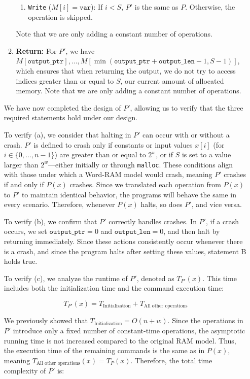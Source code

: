\documentclass[11pt]{article}
\begin{document}
\begin{enumerate}
\begin{enumerate}
\begin{enumerate}
        \item \texttt{Write} ($M[i] = \texttt{var}$): If $i < S$, $P'$ is the same as $P$. Otherwise, the operation is skipped.
    \end{enumerate}
    Note that we are only adding a constant number of operations.
    \item \textbf{Return: } For $P'$, we have $M[\texttt{output\_ptr}], \dots, M[\min(\texttt{output\_ptr} + \texttt{output\_len} - 1, S - 1)]$, which ensures that when returning the output, we do not try to access indices greater than or equal to $S$, our current amount of allocated memory. Note that we are only adding a constant number of operations.
\end{enumerate}

We have now completed the design of $P'$, allowing us to verify that the three required statements hold under our design.

To verify (a), we consider that halting in $P'$ can occur with or without a crash. $P'$ is defined to crash only if constants or input values $x[i]$ (for $i \in \{0, \dots, n-1\}$) are greater than or equal to $2^w$, or if $S$ is set to a value larger than $2^w$—either initially or through \texttt{malloc}. These conditions align with those under which a Word-RAM model would crash, meaning $P'$ crashes if and only if $P(x)$ crashes. Since we translated each operation from $P(x)$ to $P'$ to maintain identical behavior, the programs will behave the same in every scenario. Therefore, whenever $P(x)$ halts, so does $P'$, and vice versa.

To verify (b), we confirm that $P'$ correctly handles crashes. In $P'$, if a crash occurs, we set $\texttt{output\_ptr} = 0$ and $\texttt{output\_len} = 0$, and then halt by returning immediately. Since these actions consistently occur whenever there is a crash, and since the program halts after setting these values, statement B holds true.

To verify (c), we analyze the runtime of $P'$, denoted as $T_{P'}(x)$. This time includes both the initialization time and the command execution time:

\[
T_{P'}(x) = T_{\text{Initialization}} + T_{\text{All other operations}}
\]

We previously showed that $T_{\text{Initialization}} = O(n + w)$. Since the operations in $P'$ introduce only a fixed number of constant-time operations, the asymptotic running time is not increased compared to the original RAM model. Thus, the execution time of the remaining commands is the same as in $P(x)$, meaning $T_{\text{All other operations}}(x) = T_{P}(x)$. Therefore, the total time complexity of $P'$ is:


\end{enumerate}
\end{document}
